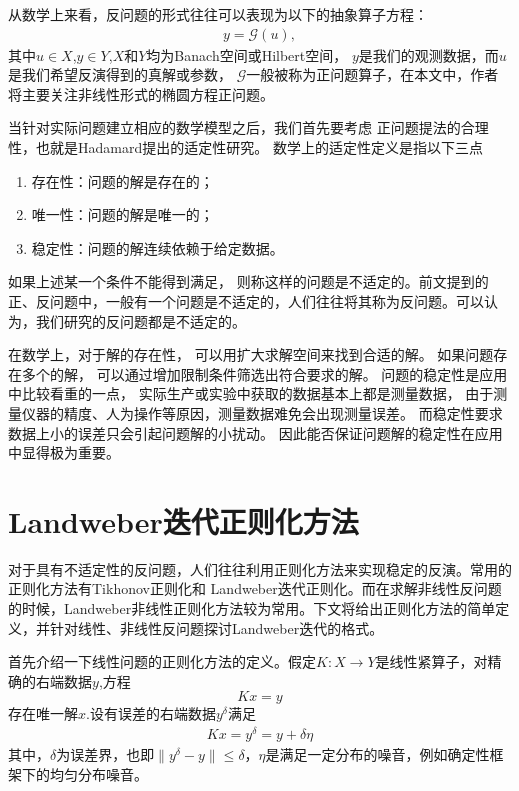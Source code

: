 \documentclass[a4paper,12pt,oneside,CJK]{cctbook}
\theoremstyle{definition}
\numberwithin{equation}{section}
\begin{document}
从数学上来看，反问题的形式往往可以表现为以下的抽象算子方程：
\begin{eqnarray*}
    y=\mathcal{G}(u),
\end{eqnarray*}
其中$u\in X$,$y\in Y$,$X$和$Y$均为Banach空间或Hilbert空间，
$y$是我们的观测数据，而$u$是我们希望反演得到的真解或参数，
$\mathcal{G}$一般被称为正问题算子，在本文中，作者将主要关注非线性形式的椭圆方程正问题。

当针对实际问题建立相应的数学模型之后，我们首先要考虑
正问题提法的合理性，也就是Hadamard提出的适定性研究。
数学上的适定性定义是指以下三点
\begin{enumerate}
   \item 存在性：问题的解是存在的；
  \item 唯一性：问题的解是唯一的；
  \item 稳定性：问题的解连续依赖于给定数据。
\end{enumerate}
如果上述某一个条件不能得到满足，
则称这样的问题是不适定的。前文提到的正、反问题中，一般有一个问题是不适定的，人们往往将其称为反问题。可以认为，我们研究的反问题都是不适定的。

在数学上，对于解的存在性，
可以用扩大求解空间来找到合适的解。
如果问题存在多个的解，
可以通过增加限制条件筛选出符合要求的解。
问题的稳定性是应用中比较看重的一点，
实际生产或实验中获取的数据基本上都是测量数据，
由于测量仪器的精度、人为操作等原因，测量数据难免会出现测量误差。
而稳定性要求数据上小的误差只会引起问题解的小扰动。
因此能否保证问题解的稳定性在应用中显得极为重要。


\section{Landweber迭代正则化方法}

对于具有不适定性的反问题，人们往往利用正则化方法来实现稳定的反演。常用的正则化方法有Tikhonov正则化和
Landweber迭代正则化。而在求解非线性反问题的时候，Landweber非线性正则化方法较为常用。下文将给出正则化方法的简单定义，并针对线性、非线性反问题探讨Landweber迭代的格式。

首先介绍一下线性问题的正则化方法的定义。假定$K:X\rightarrow Y$是线性紧算子，对精确的右端数据$y$,方程
$$Kx=y$$
存在唯一解$x$.设有误差的右端数据$y^{\delta}$满足
\begin{align}\label{eq1_operator}
Kx=y^{\delta} = y + \delta\eta
\end{align}
其中，$\delta$为误差界，也即$\|y^{\delta}-y\|\leq \delta$，$\eta$是满足一定分布的噪音，例如确定性框架下的均匀分布噪音。
\end{document}

